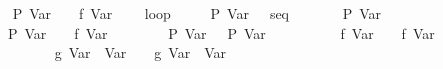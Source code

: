 \documentclass{llncs}
\begin{document}
\begin{isabellebody}
\ \ \ \ {}\isanewline
\ \ {}\ P\ {}Var\ {}{}{}\ {}\ {}{}\ f\ {}Var\ {}{}\isanewline
\ \ {}\ loop\isanewline
\ \ \ \ {}\ {}{}P\ {}Var\ {}{}{}\ {}\ seq\isanewline
\ \ \ \ \ \ {}\ P\ {}Var\ {}{}\isanewline
\ \ \ \ \ \ {}\ {}{}{}P\ {}Var\ {}{}{}{}\ {}\ {}{}\ f\ {}Var\ {}{}{}\isanewline
\ \ \ \ \ \ {}\ P\ {}Var\ {}{}{}\ {}\ {}P\ {}Var\ {}{}{}\isanewline
\ \ \ \ \ \ {}\ {}\ {}{}\ f\ {}Var\ {}{}{}\ {}\ {}{}\ f\ {}Var\ {}{}\isanewline
\ \ \ \ \ \ {}\isanewline
\ \ \ \ {}\ {}\ {}{}\ g\ {}Var\ {}{}\ {}Var\ {}{}{}\ {}\ {}{}\ g\ {}Var\ {}{}\ {}Var\ {}{}\isanewline

\end{isabellebody}
\end{document}
